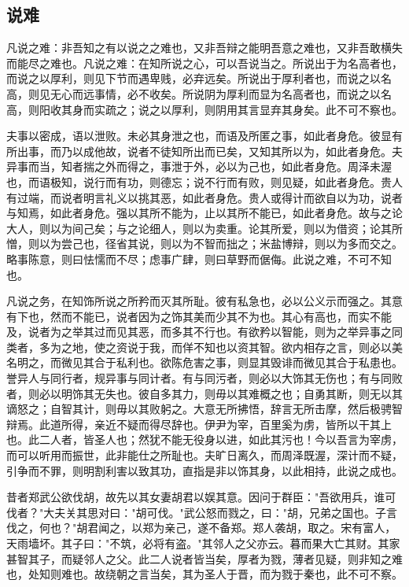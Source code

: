 \documentclass[]{article}
\begin{document}
\hypertarget{header-n890}{%
\subsection{说难}\label{header-n890}}

凡说之难：非吾知之有以说之之难也，又非吾辩之能明吾意之难也，又非吾敢横失而能尽之难也。凡说之难：在知所说之心，可以吾说当之。所说出于为名高者也，而说之以厚利，则见下节而遇卑贱，必弃远矣。所说出于厚利者也，而说之以名高，则见无心而远事情，必不收矣。所说阴为厚利而显为名高者也，而说之以名高，则阳收其身而实疏之；说之以厚利，则阴用其言显弃其身矣。此不可不察也。

夫事以密成，语以泄败。未必其身泄之也，而语及所匿之事，如此者身危。彼显有所出事，而乃以成他故，说者不徒知所出而已矣，又知其所以为，如此者身危。夫异事而当，知者揣之外而得之，事泄于外，必以为己也，如此者身危。周泽未渥也，而语极知，说行而有功，则德忘；说不行而有败，则见疑，如此者身危。贵人有过端，而说者明言礼义以挑其恶，如此者身危。贵人或得计而欲自以为功，说者与知焉，如此者身危。强以其所不能为，止以其所不能已，如此者身危。故与之论大人，则以为间己矣；与之论细人，则以为卖重。论其所爱，则以为借资；论其所憎，则以为尝己也，径省其说，则以为不智而拙之；米盐博辩，则以为多而交之。略事陈意，则曰怯懦而不尽；虑事广肆，则曰草野而倨侮。此说之难，不可不知也。

凡说之务，在知饰所说之所矜而灭其所耻。彼有私急也，必以公义示而强之。其意有下也，然而不能已，说者因为之饰其美而少其不为也。其心有高也，而实不能及，说者为之举其过而见其恶，而多其不行也。有欲矜以智能，则为之举异事之同类者，多为之地，使之资说于我，而佯不知也以资其智。欲内相存之言，则必以美名明之，而微见其合于私利也。欲陈危害之事，则显其毁诽而微见其合于私患也。誉异人与同行者，规异事与同计者。有与同污者，则必以大饰其无伤也；有与同败者，则必以明饰其无失也。彼自多其力，则毋以其难概之也；自勇其断，则无以其谪怒之；自智其计，则毋以其败躬之。大意无所拂悟，辞言无所击摩，然后极骋智辩焉。此道所得，亲近不疑而得尽辞也。伊尹为宰，百里奚为虏，皆所以干其上也。此二人者，皆圣人也；然犹不能无役身以进，如此其污也！今以吾言为宰虏，而可以听用而振世，此非能仕之所耻也。夫旷日离久，而周泽既渥，深计而不疑，引争而不罪，则明割利害以致其功，直指是非以饰其身，以此相持，此说之成也。

昔者郑武公欲伐胡，故先以其女妻胡君以娱其意。因问于群臣："吾欲用兵，谁可伐者？"大夫关其思对曰："胡可伐。"武公怒而戮之，曰："胡，兄弟之国也。子言伐之，何也？"胡君闻之，以郑为亲己，遂不备郑。郑人袭胡，取之。宋有富人，天雨墙坏。其子曰："不筑，必将有盗。"其邻人之父亦云。暮而果大亡其财。其家甚智其子，而疑邻人之父。此二人说者皆当矣，厚者为戮，薄者见疑，则非知之难也，处知则难也。故绕朝之言当矣，其为圣人于晋，而为戮于秦也，此不可不察。
\end{document}
